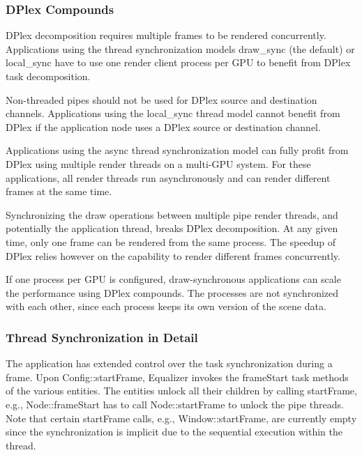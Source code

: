 \documentclass[10pt,a4]{scrartcl}
\begin{document}
\subsubsection{\label{sAdvDPlex}DPlex Compounds}

DPlex decomposition requires multiple frames to be rendered
concurrently. Applications using the thread synchronization models
\textsf{draw\_sync} (the default) or \textsf{local\_sync} have to use
one render client process per GPU to benefit from DPlex task
decomposition.

Non-threaded pipes should not be used for DPlex source and destination
channels. Applications using the \textsf{local\_sync} thread model cannot
benefit from DPlex if the application node uses a DPlex source or destination
channel.

Applications using the \textsf{async} thread synchronization model can
fully profit from DPlex using multiple render threads on a multi-GPU
system. For these applications, all render threads run asynchronously
and can render different frames at the same time.

Synchronizing the draw operations between multiple pipe render threads,
and potentially the application thread, breaks DPlex decomposition. At
any given time, only one frame can be rendered from the same
process. The speedup of DPlex relies however on the capability to
render different frames concurrently.

If one process per GPU is configured, draw-synchronous applications can
scale the performance using DPlex compounds. The processes are not
synchronized with each other, since each process keeps its own version
of the scene data.


\subsubsection{Thread Synchronization in Detail}

The application has extended control over the task synchronization
during a frame. Upon \textsf{Config::startFrame}, Equalizer invokes the
\textsf{frameStart} task methods of the various entities. The entities
unlock all their children by calling \textsf{startFrame}, e.g.,
\textsf{Node::frameStart} has to call \textsf{Node::startFrame}
to unlock the pipe threads. Note that certain \textsf{startFrame} calls,
e.g., \textsf{Window::startFrame}, are currently empty since the
synchronization is implicit due to the sequential execution within the
thread.
\end{document}
